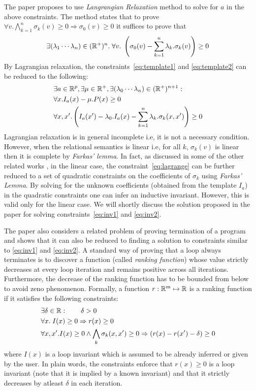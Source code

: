 The paper proposes to use \emph{Langrangian Relaxation} method to solve for $a$ in the above constraints. The method states that to prove 
$\forall v. \bigwedge \limits_{k=1}^{n} \sigma_k(v) \ge 0 \Rightarrow \sigma_0(v) \ge 0$ it suffices to prove that 
%
\begin{align}
\exists (\lambda_1 \cdots \lambda_n) \in (\real^+)^n. \; \forall v. \; \left( \sigma_0(v) -
\sum \limits_{k=1}^{n} \lambda_k. \sigma_k(v) \right) \ge 0 \label{eq:lagrange}
\end{align}
%
By Lagrangian relaxation, the constraints~\ref{eq:template1} and \ref{eq:template2}
can be reduced to the following:
%
\begin{align}
& \nonumber \exists a \in \real^p, \exists \mu \in \real^+, \exists (\lambda_0 \cdots \lambda_n) \in (\real^+)^{n+1}  : \\
&\forall x. I_a(x) - \mu.P(x)  \ge 0  \label{eq:inv1}\\
&\forall x,x'. \left( I_a(x') - \lambda_0.I_a(x) - \sum \limits_{k=1}^{n} \lambda_k. \sigma_k(x,x') \right)  \ge 0 \label{eq:inv2}
\end{align}
%
Lagrangian relaxation is in general incomplete i.e, it is not a necessary condition.
However, when the relational semantics is linear i.e, for all $k$, 
$\sigma_k(v)$ is linear then it is complete by \emph{Farkas' lemma}.
In fact, as discussed in some of the other related works \cite{ssriram:CAV03,ssriram:SAS04}, in the linear case, the constraint~\ref{eq:lagrange} 
can be further reduced to a set of quadratic constraints on the 
coefficients of $\sigma_k$ using \emph{Farkas' Lemma}. 
By solving for the unknown coefficients (obtained from the template $I_a$) in the
quadratic constraints one can infer an inductive invariant.
However, this is valid only for the linear case. We will shortly discuss
the solution proposed in the paper for solving constraints~\ref{eq:inv1} and \ref{eq:inv2}.

The paper also considers a related problem of proving termination of a program
and shows that it can also be reduced to finding a solution to constraints 
similar to \ref{eq:inv1} and \ref{eq:inv2}. A standard way of proving that 
a loop always terminates is to discover a function (called \emph{ranking function}) whose value strictly decreases at every loop iteration and remains positive across all iterations.
Furthermore, the decrease of the ranking function has to be bounded from below to avoid zeno phenomenon.
Formally, a function $r: \mathbb{R}^m \mapsto \mathbb{R}$ is a ranking function 
if it satisfies the following constraints:
%
\begin{align*}
& \exists \delta \in \mathbb{R}:  \qquad \delta > 0 \\
& \forall x. \; I(x) \ge 0 \Rightarrow r(x) \ge 0 \\
& \forall x,x'. I(x) \ge 0  \wedge \bigwedge_k \sigma_k(x,x') \ge 0 \Rightarrow  
(r(x) - r(x') - \delta) \ge 0
\end{align*}
%
where $I(x)$ is a loop invariant which is assumed to be already inferred 
or given by the user. 
In plain words, the constraints enforce that $r(x) \ge 0$ is a loop invariant 
(note that it is implied by a known invariant) and that it strictly decreases by atleast $\delta$ in each iteration.

